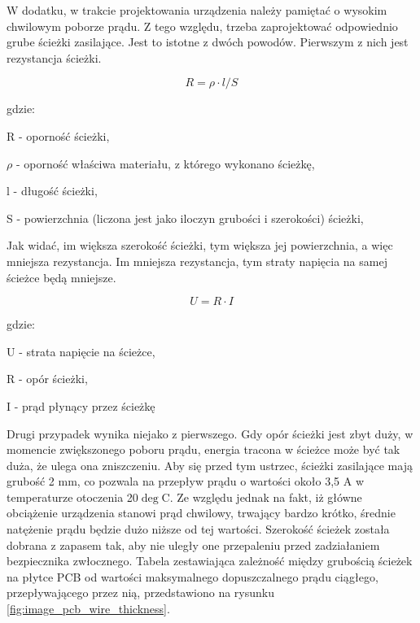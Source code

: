 W dodatku, w trakcie projektowania urządzenia należy pamiętać o wysokim chwilowym poborze prądu. Z tego względu, trzeba zaprojektować odpowiednio grube ścieżki zasilające. Jest to istotne z dwóch powodów. Pierwszym z nich jest rezystancja ścieżki.

\begin{equation}
 R = \rho \cdot l / S 
 \label{eq_pcb_wire_resistance}
\end{equation}

gdzie:

R - oporność ścieżki,

$\rho$ - oporność właściwa materiału, z którego wykonano ścieżkę,

l - długość ścieżki,

S - powierzchnia (liczona jest jako iloczyn grubości i szerokości) ścieżki,

Jak widać, im większa szerokość ścieżki, tym większa jej powierzchnia, a więc mniejsza rezystancja. Im mniejsza rezystancja, tym straty napięcia na samej ścieżce będą mniejsze.

\begin{equation}
 U = R \cdot I
 \label{eq_voltage_drop_on_pcb_wire} 
\end{equation}

 gdzie:
 
 U - strata napięcie na ścieżce,
 
 R - opór ścieżki,
 
 I - prąd płynący przez ścieżkę
 
\clearpage
Drugi przypadek wynika niejako z pierwszego. Gdy opór ścieżki jest zbyt duży, w momencie zwiększonego poboru prądu, energia tracona w ścieżce może być tak duża, że ulega ona zniszczeniu. Aby się przed tym ustrzec, ścieżki zasilające mają grubość 2 mm, co pozwala na przepływ prądu o wartości około 3,5 A w temperaturze otoczenia 20$\deg$C. Ze względu jednak na fakt, iż główne obciążenie urządzenia stanowi prąd chwilowy, trwający bardzo krótko, średnie natężenie prądu będzie dużo niższe od tej wartości. Szerokość ścieżek została dobrana z zapasem tak, aby nie uległy one przepaleniu przed zadziałaniem bezpiecznika zwłocznego. Tabela zestawiająca zależność między grubością ścieżek na płytce PCB od wartości maksymalnego dopuszczalnego prądu ciągłego, przepływającego przez nią, przedstawiono na rysunku \ref{fig:image_pcb_wire_thickness}.

